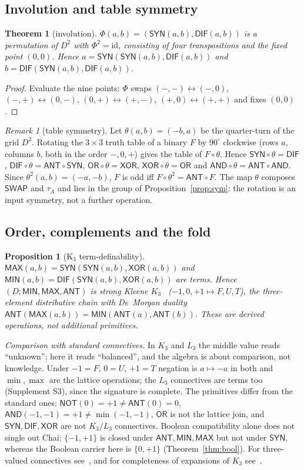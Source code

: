 \documentclass[conference]{IEEEtran}
\newcommand{\D}{D}
\newcommand{\SYN}{\mathsf{SYN}}
\newcommand{\DIF}{\mathsf{DIF}}
\newcommand{\OR}{\mathsf{OR}}
\newcommand{\XOR}{\mathsf{XOR}}
\newcommand{\AND}{\mathsf{AND}}
\newcommand{\NOT}{\mathsf{NOT}}
\newcommand{\ANT}{\mathsf{ANT}}
\newcommand{\MAX}{\mathsf{MAX}}
\newcommand{\MIN}{\mathsf{MIN}}
\newcommand{\SWAP}{\mathsf{SWAP}}
\newcommand{\chai}{Chai}
\newtheorem{theorem}{Theorem}
\newtheorem{proposition}{Proposition}
\theoremstyle{remark}
\newtheorem{remark}{Remark}
\begin{document}
	\subsection{Involution and table symmetry}
	\begin{theorem}[involution]\label{thm:phi}
		$\Phi(a,b)=(\SYN(a,b),\DIF(a,b))$ is a permutation of $\D^2$ with $\Phi^2=\mathrm{id}$, consisting of four transpositions and the fixed point $(0,0)$. Hence $a=\SYN(\SYN(a,b),\DIF(a,b))$ and $b=\DIF(\SYN(a,b),\DIF(a,b))$.
	\end{theorem}
	\begin{proof}
		Evaluate the nine points: $\Phi$ swaps $(-,-)\!\leftrightarrow\!(-,0)$, $(-,+)\!\leftrightarrow\!(0,-)$, $(0,+)\!\leftrightarrow\!(+,-)$, $(+,0)\!\leftrightarrow\!(+,+)$ and fixes $(0,0)$.
	\end{proof}
	
	\begin{remark}[table symmetry]\label{rem:rot}
		Let $\theta(a,b)=(-b,a)$ be the quarter-turn of the grid $\D^2$. Rotating the $3\times3$ truth table of a binary $F$ by $90^\circ$ clockwise (rows $a$, columns $b$, both in the order $-,0,+$) gives the table of $F\circ\theta$. Hence $\SYN\circ\theta=\DIF$, $\DIF\circ\theta=\ANT\circ\SYN$, $\OR\circ\theta=\XOR$, $\XOR\circ\theta=\OR$ and $\AND\circ\theta=\ANT\circ\AND$. Since $\theta^2(a,b)=(-a,-b)$, $F$ is odd iff $F\circ\theta^2=\ANT\circ F$. The map $\theta$ composes $\SWAP$ and $\tau_A$ and lies in the group of Proposition~\ref{prop:sym}: the rotation is an input symmetry, not a further operation.
	\end{remark}
	
	\subsection{Order, complements and the fold}
	\begin{proposition}[K$_3$ term-definability]\label{prop:k3} 
		$\MAX(a,b)=\SYN(\SYN(a,b),\XOR(a,b))$ and $\MIN(a,b)=\DIF(\SYN(a,b),\XOR(a,b))$ are terms. Hence $(\D;\MIN,\MAX,\ANT)$ is strong Kleene $K_3$~\cite{kleene1952,cignoli2000} ($-1,0,+1\mapsto F,U,T$), the three-element distributive chain with De~Morgan duality $\ANT(\MAX(a,b))=\MIN(\ANT(a),\ANT(b))$. These are derived operations, not additional primitives.
	\end{proposition}
	\emph{Comparison with standard connectives.} In $K_3$ and $L_3$ the middle value reads ``unknown''; here it reads ``balanced'', and the algebra is about comparison, not knowledge. Under $-1=F$, $0=U$, $+1=T$ negation is $a\mapsto-a$ in both and $\min,\max$ are the lattice operations; the $L_3$ connectives are terms too (Supplement S3), since the signature is complete. The primitives differ from the standard ones: $\NOT(0)=+1\ne\ANT(0)=0$, $\AND(-1,-1)=+1\ne\min(-1,-1)$, $\OR$ is not the lattice join, and $\SYN,\DIF,\XOR$ are not $K_3/L_3$ connectives. Boolean compatibility alone does not single out \chai{}: $\{-1,+1\}$ is closed under $\ANT,\MIN,\MAX$ but not under $\SYN$, whereas the Boolean carrier here is $\{0,+1\}$ (Theorem~\ref{thm:bool}). For three-valued connectives see~\cite{lukasiewicz1970}, and for completeness of expansions of $K_3$ see~\cite{roblesmendez2022}.
	
\end{document}
